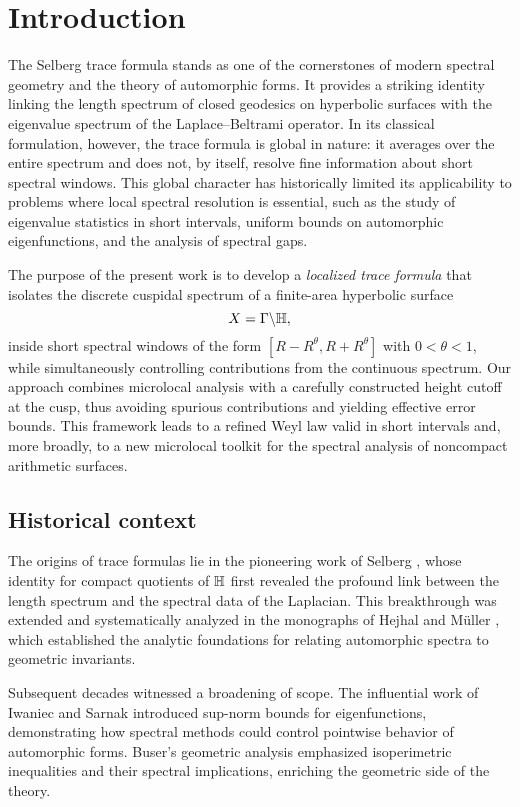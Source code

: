 \section{Introduction}\label{sec:intro}

The Selberg trace formula stands as one of the cornerstones of modern spectral geometry and the theory of automorphic forms. It provides a striking identity linking the length spectrum of closed geodesics on hyperbolic surfaces with the eigenvalue spectrum of the Laplace--Beltrami operator. In its classical formulation, however, the trace formula is global in nature: it averages over the entire spectrum and does not, by itself, resolve fine information about short spectral windows. This global character has historically limited its applicability to problems where local spectral resolution is essential, such as the study of eigenvalue statistics in short intervals, uniform bounds on automorphic eigenfunctions, and the analysis of spectral gaps.

The purpose of the present work is to develop a \emph{localized trace formula} that isolates the discrete cuspidal spectrum of a finite-area hyperbolic surface
\[
X=\Gamma \backslash \mathbb{H},
\]
inside short spectral windows of the form $[R-R^\theta, R+R^\theta]$ with $0<\theta<1$, while simultaneously controlling contributions from the continuous spectrum. Our approach combines microlocal analysis with a carefully constructed height cutoff at the cusp, thus avoiding spurious contributions and yielding effective error bounds. This framework leads to a refined Weyl law valid in short intervals and, more broadly, to a new microlocal toolkit for the spectral analysis of noncompact arithmetic surfaces.

\subsection{Historical context}\label{subsec:history}

The origins of trace formulas lie in the pioneering work of Selberg \cite{selberg1956}, whose identity for compact quotients of $\mathbb{H}$ first revealed the profound link between the length spectrum and the spectral data of the Laplacian. This breakthrough was extended and systematically analyzed in the monographs of Hejhal \cite{hejhal1976,hejhal1983} and Müller \cite{mueller1983}, which established the analytic foundations for relating automorphic spectra to geometric invariants.

Subsequent decades witnessed a broadening of scope. The influential work of Iwaniec and Sarnak \cite{iwaniec1995} introduced sup-norm bounds for eigenfunctions, demonstrating how spectral methods could control pointwise behavior of automorphic forms. Buser’s geometric analysis \cite{buser1992} emphasized isoperimetric inequalities and their spectral implications, enriching the geometric side of the theory.

